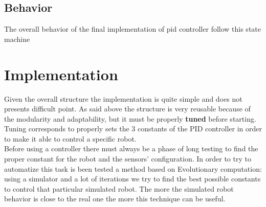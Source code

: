 \documentclass{llncs}
\newcommand{\labelsec}[1]{\label{sec:#1}}
\begin{document}
\subsection{Behavior}
The overall behavior of the final implementation of pid controller follow this state machine 
\begin{center}
\end{center}

\newpage
\section{Implementation}
\labelsec{Implementation}
Given the overall structure the implementation is quite simple and does not presents difficult point.  
As said above the structure is very reusable because of the modularity and adaptability, but it must be properly \textbf{tuned} before starting. Tuning corresponds to properly sets the 3 constants of the PID controller in order to make it able to control a specific robot.\\

\noindent Before using a controller there must always be a phase of long testing to find the proper constant for the robot and the sensors' configuration. In order to try to automatize this task is been tested a method based on Evolutionary computation: using a simulator and a lot of iterations we try to find the best possible constants to control that particular simulated robot. The more the simulated robot behavior is close to the real one the more this technique can be useful. \\

\begin{center}
\end{center}
\end{document}
